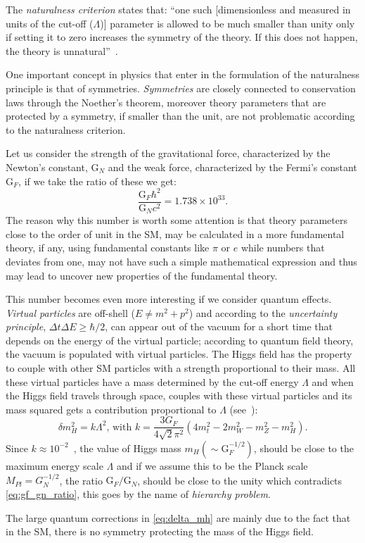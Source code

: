The \emph{naturalness criterion} states that: ``one such [dimensionless and
measured in units of the cut-off ($\Lambda$)] parameter is allowed to be much
smaller than unity only if setting it to zero increases the symmetry of the
theory. If this does not happen, the theory is unnatural''~\cite{thooft:gauge}.

One important concept in physics that enter in the formulation of the
naturalness principle is that of symmetries. \emph{Symmetries} are closely
connected to conservation laws through the Noether's theorem, moreover theory
parameters that are protected by a symmetry, if smaller than the unit, are not
problematic according to the naturalness criterion.

Let us consider the strength of the gravitational force, characterized by the
Newton's constant, G$_N$ and the weak force, characterized by the Fermi's
constant G$_F$, if we take the ratio of these we get:
\begin{equation}
  \label{eq:gf_gn_ratio}
  \frac{\mathrm{G}_F \hbar^2}{\mathrm{G}_N c^2} = 1.738 \times 10^{33}.
\end{equation}
The reason why this number is worth some attention is that theory parameters
close to the order of unit in the SM, may be calculated in a more fundamental
theory, if any, using fundamental constants like $\pi$ or $e$ while numbers that
deviates from one, may not have such a simple mathematical expression and thus
may lead to uncover new properties of the fundamental theory.

This number becomes even more interesting if we consider quantum effects.
\emph{Virtual particles} are off-shell ($E \neq m^2 + p^2$) and according to the
\emph{uncertainty principle}, $\Delta t \Delta E \geq \hbar / 2$, can appear out
of the vacuum for a short time that depends on the energy of the virtual
particle; according to quantum field theory, the vacuum is populated with
virtual particles. The Higgs field has the property to couple with other SM
particles with a strength proportional to their mass. All these virtual
particles have a mass determined by the cut-off energy $\Lambda$ and when the
Higgs field travels through space, couples with these virtual particles and its
mass squared gets a contribution proportional to $\Lambda$
(see~\cite{Giudice:2008bi}):
\begin{equation}
  \label{eq:delta_mh}
  \delta m_H^2 = k \Lambda^2 \text{, with } k = \frac{3 G_F}{4 \sqrt{2}
    \pi^2}(4m_t^2 - 2m_W^2 - m_Z^2 - m_H^2).
\end{equation}
Since $k \approx 10^{-2}$~\cite{Giudice:2008bi}, the value of Higgs mass
$m_H (\sim \mathrm{G}_F^{-1/2})$, should be close to the maximum energy scale
$\Lambda$ and if we assume this to be the Planck scale $M_{Pl} = G_N^{-1/2}$, the
ratio $\mathrm{G}_F/\mathrm{G}_N$, should be close to the unity which
contradicts \cref{eq:gf_gn_ratio}, this goes by the name of \emph{hierarchy
  problem}.

The large quantum corrections in \cref{eq:delta_mh} are mainly due to the fact
that in the SM, there is no symmetry protecting the mass of the Higgs field.
